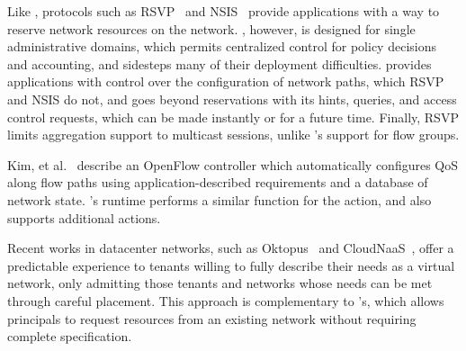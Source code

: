Like \sys, protocols such as RSVP~\cite{rfc2205} and NSIS~\cite{rfc5974} 
provide applications with a way to
reserve network resources on the network. \sys, however, is designed
for single administrative domains, which permits centralized control for policy
decisions and accounting, and sidesteps many of their deployment difficulties. 
\sys provides applications with control over the configuration of network paths, which RSVP and NSIS do not, and goes beyond reservations
with its hints, queries, and access control requests, which can be made instantly or for a future
time. Finally, RSVP limits aggregation
support to multicast sessions, unlike \sys's support for flow groups. %



Kim, et al.~\cite{Kim:2010} describe an OpenFlow controller which
automatically configures QoS along flow paths using application-described
requirements and a database of network state. \sys's runtime performs
a similar function for the  action, and also supports
additional actions.

Recent works in datacenter networks, such as Oktopus~\cite{Ballani:2011} and
CloudNaaS~\cite{Benson2011cloudnaas}, offer a predictable experience to tenants
willing to fully describe their needs as a virtual network, only admitting those tenants
and networks whose needs can be met through careful placement. This approach
is complementary to \sys's, which allows principals to request resources
from an existing network without requiring complete specification.


